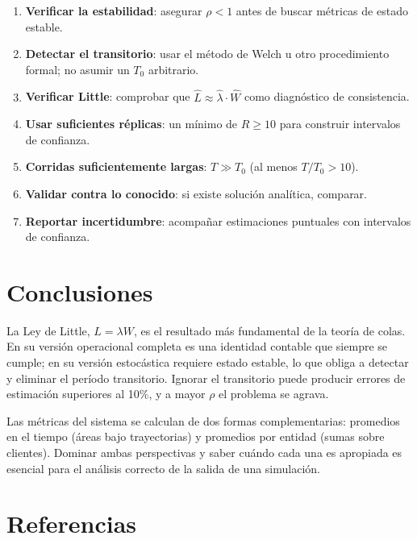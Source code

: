 \documentclass[11pt, letterpaper]{article}
\begin{document}
\begin{enumerate}
    \item \textbf{Verificar la estabilidad}: asegurar $\rho < 1$ antes de buscar métricas de estado estable.
    \item \textbf{Detectar el transitorio}: usar el método de Welch u otro procedimiento formal; no asumir un $T_0$ arbitrario.
    \item \textbf{Verificar Little}: comprobar que $\hat{L} \approx \hat{\lambda}\cdot\hat{W}$ como diagnóstico de consistencia.
    \item \textbf{Usar suficientes réplicas}: un mínimo de $R \geq 10$ para construir intervalos de confianza.
    \item \textbf{Corridas suficientemente largas}: $T \gg T_0$ (al menos $T/T_0 > 10$).
    \item \textbf{Validar contra lo conocido}: si existe solución analítica, comparar.
    \item \textbf{Reportar incertidumbre}: acompañar estimaciones puntuales con intervalos de confianza.
\end{enumerate}


\section{Conclusiones}

La Ley de Little, $L = \lambda W$, es el resultado más fundamental de la teoría de colas. En su versión operacional completa es una identidad contable que siempre se cumple; en su versión estocástica requiere estado estable, lo que obliga a detectar y eliminar el período transitorio. Ignorar el transitorio puede producir errores de estimación superiores al 10\%, y a mayor $\rho$ el problema se agrava.

Las métricas del sistema se calculan de dos formas complementarias: promedios en el tiempo (áreas bajo trayectorias) y promedios por entidad (sumas sobre clientes). Dominar ambas perspectivas y saber cuándo cada una es apropiada es esencial para el análisis correcto de la salida de una simulación.

\vfill

\section*{Referencias}
\end{document}
